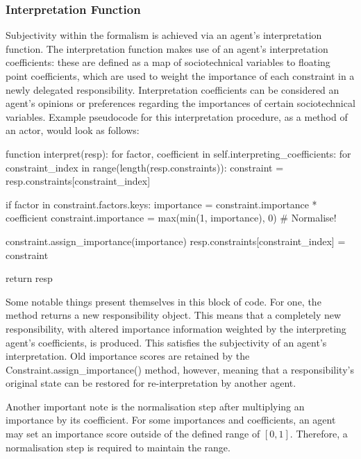 \subsubsection{Interpretation Function}\label{subsec:interpretation_function}
Subjectivity within the formalism is achieved via an agent's interpretation function. The interpretation function makes use of an agent's interpretation coefficients: these are defined as a map of sociotechnical variables to floating point coefficients, which are used to weight the importance of each constraint in a newly delegated responsibility. Interpretation coefficients can be considered an agent's opinions or preferences regarding the importances of certain sociotechnical variables. Example pseudocode for this interpretation procedure, as a method of an actor, would look as follows:

\begin{pseudocodelisting}
function interpret(resp):
    for factor, coefficient in self.interpreting_coefficients:
        for constraint_index in range(length(resp.constraints)):
            constraint = resp.constraints[constraint_index]

            if factor in constraint.factors.keys:
                importance = constraint.importance * coefficient
                constraint.importance = max(min(1, importance), 0)  # Normalise!

            constraint.assign_importance(importance)
            resp.constraints[constraint_index] = constraint

    return resp
\end{pseudocodelisting}

Some notable things present themselves in this block of code. For one, the method returns a new responsibility object. This means that a completely new responsibility, with altered importance information weighted by the interpreting agent's coefficients, is produced. This satisfies the subjectivity of an agent's interpretation. Old importance scores are retained by the Constraint.assign\_importance() method, however, meaning that a responsibility's original state can be restored for re-interpretation by another agent.\par

Another important note is the normalisation step after multiplying an importance by its coefficient. For some importances and coefficients, an agent may set an importance score outside of the defined range of \([0,1]\). Therefore, a normalisation step is required to maintain the range.\par

